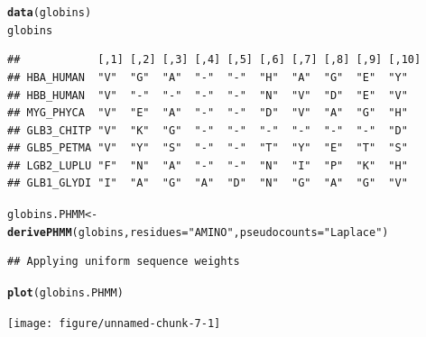 \documentclass{article}\usepackage[]{graphicx}\usepackage[]{color}
\makeatletter
\newcommand{\hlstr}[1]{\textcolor[rgb]{0.192,0.494,0.8}{#1}}%
\newcommand{\hlstd}[1]{\textcolor[rgb]{0.345,0.345,0.345}{#1}}%
\newcommand{\hlkwb}[1]{\textcolor[rgb]{0.69,0.353,0.396}{#1}}%
\newcommand{\hlkwc}[1]{\textcolor[rgb]{0.333,0.667,0.333}{#1}}%
\newcommand{\hlkwd}[1]{\textcolor[rgb]{0.737,0.353,0.396}{\textbf{#1}}}%
\newenvironment{kframe}{%
 \def\at@end@of@kframe{}%
 \ifinner\ifhmode%
  \def\at@end@of@kframe{\end{minipage}}%
  \begin{minipage}{\columnwidth}%
 \fi\fi%
 \def\FrameCommand##1{\hskip\@totalleftmargin \hskip-\fboxsep
 \colorbox{shadecolor}{##1}\hskip-\fboxsep
     \hskip-\linewidth \hskip-\@totalleftmargin \hskip\columnwidth}%
 \MakeFramed {\advance\hsize-\width
   \@totalleftmargin\z@ \linewidth\hsize
   \@setminipage}}%
 {\par\unskip\endMakeFramed%
 \at@end@of@kframe}
\newenvironment{knitrout}{}{} %
\makeatother
\begin{document}
\begin{center}
\begin{knitrout}
\color{fgcolor}\begin{kframe}
\begin{alltt}
\hlkwd{data}\hlstd{(globins)}
\hlstd{globins}
\end{alltt}
\begin{verbatim}
##            [,1] [,2] [,3] [,4] [,5] [,6] [,7] [,8] [,9] [,10]
## HBA_HUMAN  "V"  "G"  "A"  "-"  "-"  "H"  "A"  "G"  "E"  "Y"  
## HBB_HUMAN  "V"  "-"  "-"  "-"  "-"  "N"  "V"  "D"  "E"  "V"  
## MYG_PHYCA  "V"  "E"  "A"  "-"  "-"  "D"  "V"  "A"  "G"  "H"  
## GLB3_CHITP "V"  "K"  "G"  "-"  "-"  "-"  "-"  "-"  "-"  "D"  
## GLB5_PETMA "V"  "Y"  "S"  "-"  "-"  "T"  "Y"  "E"  "T"  "S"  
## LGB2_LUPLU "F"  "N"  "A"  "-"  "-"  "N"  "I"  "P"  "K"  "H"  
## GLB1_GLYDI "I"  "A"  "G"  "A"  "D"  "N"  "G"  "A"  "G"  "V"
\end{verbatim}
\begin{alltt}
\hlstd{globins.PHMM} \hlkwb{<-} \hlkwd{derivePHMM}\hlstd{(globins,} \hlkwc{residues} \hlstd{=} \hlstr{"AMINO"}\hlstd{,} \hlkwc{pseudocounts} \hlstd{=} \hlstr{"Laplace"}\hlstd{)}
\end{alltt}
\begin{verbatim}
## Applying uniform sequence weights
\end{verbatim}
\begin{alltt}
\hlkwd{plot}\hlstd{(globins.PHMM)}
\end{alltt}
\end{kframe}
\texttt{[image: figure/unnamed-chunk-7-1]} 
\end{knitrout}
\end{center}
\end{document}
